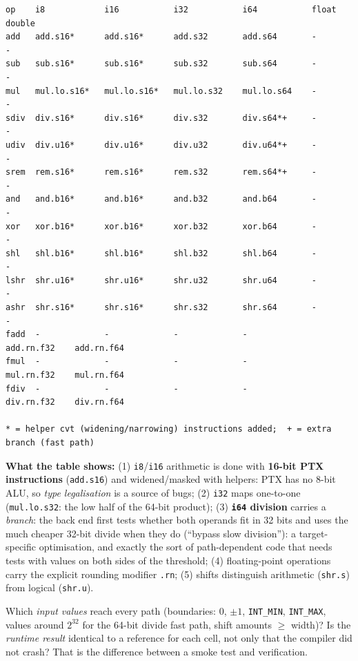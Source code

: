 \documentclass[10pt,a4paper,openany,oneside]{report}
\begin{document}
\begin{lstlisting}[style=out,title={Captured output}]
op    i8            i16           i32           i64           float         double        
add   add.s16*      add.s16*      add.s32       add.s64       -             -             
sub   sub.s16*      sub.s16*      sub.s32       sub.s64       -             -             
mul   mul.lo.s16*   mul.lo.s16*   mul.lo.s32    mul.lo.s64    -             -             
sdiv  div.s16*      div.s16*      div.s32       div.s64*+     -             -             
udiv  div.u16*      div.u16*      div.u32       div.u64*+     -             -             
srem  rem.s16*      rem.s16*      rem.s32       rem.s64*+     -             -             
and   and.b16*      and.b16*      and.b32       and.b64       -             -             
xor   xor.b16*      xor.b16*      xor.b32       xor.b64       -             -             
shl   shl.b16*      shl.b16*      shl.b32       shl.b64       -             -             
lshr  shr.u16*      shr.u16*      shr.u32       shr.u64       -             -             
ashr  shr.s16*      shr.s16*      shr.s32       shr.s64       -             -             
fadd  -             -             -             -             add.rn.f32    add.rn.f64    
fmul  -             -             -             -             mul.rn.f32    mul.rn.f64    
fdiv  -             -             -             -             div.rn.f32    div.rn.f64    

* = helper cvt (widening/narrowing) instructions added;  + = extra branch (fast path)
\end{lstlisting}
\textbf{What the table shows:} (1) \texttt{i8}/\texttt{i16} arithmetic is done with \textbf{16-bit PTX instructions} (\texttt{add.s16}) and widened/masked with helpers: PTX has no 8-bit ALU, so \emph{type legalisation} is a source of bugs; (2) \texttt{i32} maps one-to-one (\texttt{mul.lo.s32}: the low half of the 64-bit product); (3) \textbf{\texttt{i64} division} carries a \emph{branch}: the back end first tests whether both operands fit in 32 bits and uses the much cheaper 32-bit divide when they do (``bypass slow division''): a target-specific optimisation, and exactly the sort of path-dependent code that needs tests with values on both sides of the threshold; (4) floating-point operations carry the explicit rounding modifier \texttt{.rn}; (5) shifts distinguish arithmetic (\texttt{shr.s}) from logical (\texttt{shr.u}).
\begin{tipbox}
Which \emph{input values} reach every path (boundaries: $0$, $\pm1$, \texttt{INT\_MIN}, \texttt{INT\_MAX}, values around $2^{32}$ for the 64-bit divide fast path, shift amounts $\ge$ width)? Is the \emph{runtime result} identical to a reference for each cell, not only that the compiler did not crash? That is the difference between a smoke test and verification.
\end{tipbox}
\end{document}
